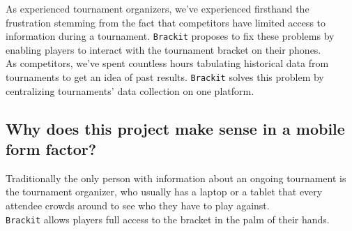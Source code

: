 \documentclass{article}
\begin{document}
As experienced tournament organizers, we've experienced firsthand the frustration stemming from the fact that competitors have limited access to information during a tournament. \texttt{Brackit} proposes to fix these problems by enabling players to interact with the tournament bracket on their phones. \\As competitors, we've spent countless hours tabulating historical data from tournaments to get an idea of past results. \texttt{Brackit} solves this problem by centralizing tournaments' data collection on one platform. 

\subsection*{Why does this project make sense in a mobile form factor?}
Traditionally the only person with information about an ongoing tournament is the tournament organizer, who usually has a laptop or a tablet that every attendee crowds around to see who they have to play against. \\\texttt{Brackit} allows players full access to the bracket in the palm of their hands.


\end{document}
